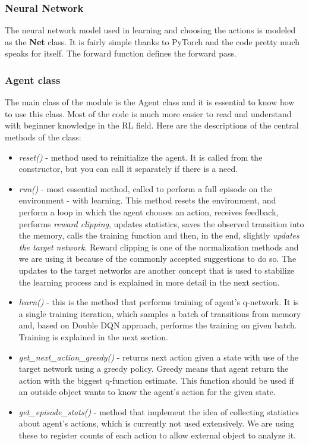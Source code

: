\documentclass{article}
\begin{document}
\subsubsection{Neural Network}
The neural network model used in learning and choosing the actions is modeled as the \textbf{Net} class. It is fairly simple thanks to PyTorch and the code pretty much speaks for itself. The forward function defines the forward pass.

\subsubsection{Agent class}
The main class of the module is the Agent class and it is essential to know how to use this class. Most of the code is much more easier to read and understand with beginner knowledge in the RL field. Here are the descriptions of the central methods of the class:

\begin{itemize}
\item \textit{reset()} - method used to reinitialize the agent. It is called from the constructor, but you can call it separately if there is a need.
\item \textit{run()} - most essential method, called to perform a full episode on the environment - with learning. This method resets the environment, and perform a loop in which the agent chooses an action, receives feedback, performs \textit{reward clipping}, updates statistics, saves the observed transition into the memory, calls the training function and then, in the end, slightly \textit{updates the target network}. Reward clipping is one of the normalization methods and we are using it because of the commonly accepted suggestions to do so. The updates to the target networks are another concept that is used to stabilize the learning process and is explained in more detail in the next section.
\item \textit{learn()} - this is the method that performs training of agent's q-network. It is a single training iteration, which samples a batch of transitions from memory and, based on Double DQN approach, performs the training on given batch. Training is explained in the next section. 
\item \textit{get\_next\_action\_greedy()} - returns next action given a state with use of the target network using a greedy policy. Greedy means that agent return the action with the biggest q-function estimate. This function should be used if an outside object wants to know the agent's action for the given state.
\item \textit{get\_episode\_stats()} - method that implement the idea of collecting statistics about agent's actions, which is currently not used extensively. We are using these to register counts of each action to allow external object to analyze it.
\end{itemize}
\end{document}
